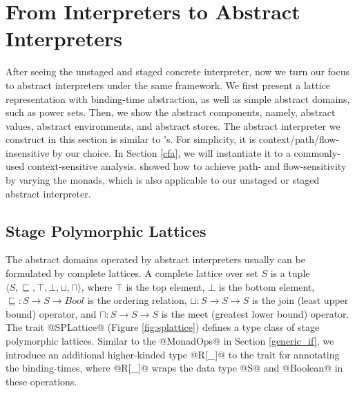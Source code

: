 \section{From Interpreters to Abstract Interpreters} \label{unstaged_abs}

After seeing the unstaged and staged concrete interpreter, now we turn our
focus to abstract interpreters under the same framework. We first present a
lattice representation with binding-time abstraction, as well as simple
abstract domains, such as power sets.  Then, we show the abstract
components, namely, abstract values, abstract environments, and abstract stores.
The abstract interpreter we construct in this section is similar to
\citet{DBLP:journals/pacmpl/DaraisLNH17}'s. For simplicity, it is
context/path/flow-insensitive by our choice. In Section \ref{cfa}, we will
instantiate it to a commonly-used context-sensitive analysis.
\citet{Darais:2015:GTM:2814270.2814308} showed how to achieve path- and
flow-sensitivity by varying the monads, which is also applicable to our
unstaged or staged abstract interpreter.

\subsection{Stage Polymorphic Lattices} \label{stagedpoly_lat}

The abstract domains operated by abstract interpreters usually can be
formulated by complete lattices.
A complete lattice over set $S$ is a tuple $\langle S, \sqsubseteq, \top,
\bot, \sqcup, \sqcap \rangle$, where $\top$ is the top element, $\bot$ is the
bottom element, $\sqsubseteq : S \to S \to Bool$ is the
ordering relation, $\sqcup: S \to S \to S$ is the join (least upper bound)
operator, and $\sqcap: S \to S \to S$ is the meet (greatest lower bound)
operator. The trait @SPLattice@ (Figure \ref{fig:splattice}) defines a type
class of stage polymorphic lattices. Similar to the @MonadOps@ in Section
\ref{generic_if}, we introduce an additional higher-kinded type @R[_]@ to the
trait for annotating the binding-times, where @R[_]@ wraps the data type
@S@ and @Boolean@ in these operations.

